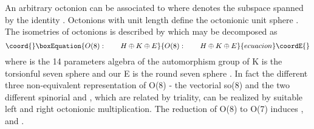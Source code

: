 \documentclass[a4paper,12pt]{book}
\begin{document}
An arbitrary octonion can be associated to \coordHE{} \cite{luk} where \coordHE{} denotes the subspace spanned by the
identity \coordHE{}. Octonions with unit length define the octonionic unit
sphere \coordHE{}. The isometries of octonions is described by \coordHE{} which may
be decomposed as 
\begin{equation}\coord{}\boxEquation{
O(8):\quad \quad H\oplus K\oplus E
}{
O(8):\quad \quad H\oplus K\oplus E
}{ecuacion}\coordE{}\end{equation}
where \coordHE{} is the 14 parameters \coordHE{} algebra of the automorphism group of \coordHE{} K is the torsionful seven sphere \coordHE{} and our E is the
round seven sphere \coordHE{}. In fact the different three non-equivalent
representation of O(8) - the vectorial so(8) and the two different spinorial 
\coordHE{} and \coordHE{}, which are related by triality, can be
realized by suitable left and right octonionic multiplication. The reduction
of O(8) to O(7) induces \coordHE{}, \coordHE{} and \coordHE{}.
\end{document}
